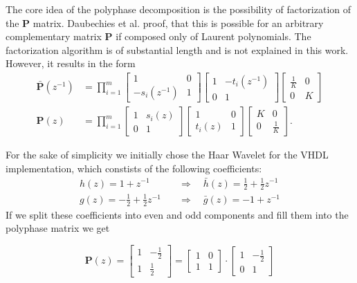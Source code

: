\begin{refsection}
The core idea of the polyphase decomposition is the possibility of factorization of the $\bm P$ matrix.
Daubechies et al. proof, that this is possible for an arbitrary complementary matrix $\bm P$ if composed only of Laurent polynomials.
The factorization algorithm is of substantial length and is not explained in this work.
However, it results in the form
\begin{align}
	\bm{\bar P}(z^{-1}) &=
	\prod_{i=1}^{m}
	\begin{bmatrix}
		1 & 0 \\
		-s_i(z^{-1}) & 1
	\end{bmatrix}
	\begin{bmatrix}
		1 & -t_i(z^{-1}) \\
		0 & 1
	\end{bmatrix}
	\begin{bmatrix}
		\frac{1}{K} & 0 \\
		0 & K
	\end{bmatrix}
	\\
	\bm P(z) &=
	\prod_{i=1}^{m}
	\begin{bmatrix}
		1 & s_i(z) \\
		0 & 1
	\end{bmatrix}
	\begin{bmatrix}
		1 & 0 \\
		t_i(z) & 1
	\end{bmatrix}
	\begin{bmatrix}
		K & 0 \\
		0 & \frac{1}{K}
	\end{bmatrix}
	.
\end{align}

For the sake of simplicity we initially chose the Haar Wavelet for the VHDL implementation, which constists of the following coefficients:
\begin{align}
h(z) = 1 + z^{-1} \quad & \Rightarrow \quad \bar h(z) = \frac{1}{2} + \frac{1}{2} z^{-1}
\\
g(z) = - \frac{1}{2} + \frac{1}{2} z^{-1} \quad & \Rightarrow \quad \bar g(z) = -1 + z^{-1}
\end{align}
If we split these coefficients into even and odd components and fill them into the polyphase matrix we get 

\begin{equation*}
\bm P(z) =
\begin{bmatrix}
1 & -\frac{1}{2} \\
1 & \frac{1}{2}
\end{bmatrix}
 = 
 \begin{bmatrix}
 1 & 0 \\
 1 & 1
 \end{bmatrix}
 \cdot
 \begin{bmatrix}
 1 & -\frac{1}{2} \\
 0 & 1
 \end{bmatrix}
\end{equation*}


\end{refsection}

